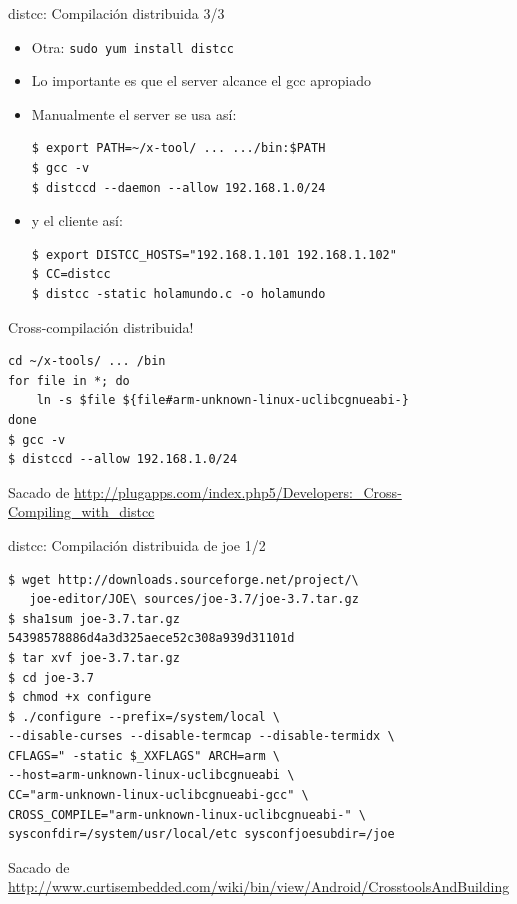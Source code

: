 \documentclass[xetex]{beamer}
\begin{document}
\begin{frame}[fragile]{distcc: Compilación distribuida 3/3}
\begin{itemize}
\item Otra: \verb=sudo yum install distcc =
\item Lo importante es que el server alcance el gcc apropiado
\item Manualmente el server se usa así: 
\begin{verbatim}
$ export PATH=~/x-tool/ ... .../bin:$PATH
$ gcc -v 
$ distccd --daemon --allow 192.168.1.0/24
\end{verbatim}
\item y el cliente así:
\begin{verbatim}
$ export DISTCC_HOSTS="192.168.1.101 192.168.1.102"
$ CC=distcc
$ distcc -static holamundo.c -o holamundo
\end{verbatim}
\end{itemize}
\end{frame}

\begin{frame}[fragile]{Cross-compilación distribuida!}
\begin{verbatim}
cd ~/x-tools/ ... /bin
for file in *; do
    ln -s $file ${file#arm-unknown-linux-uclibcgnueabi-}
done
$ gcc -v
$ distccd --allow 192.168.1.0/24
\end{verbatim}
Sacado de \url{http://plugapps.com/index.php5/Developers:_Cross-Compiling_with_distcc}
\end{frame}


\begin{frame}[fragile]{distcc: Compilación distribuida de joe 1/2}
\begin{verbatim}
$ wget http://downloads.sourceforge.net/project/\
   joe-editor/JOE\ sources/joe-3.7/joe-3.7.tar.gz  
$ sha1sum joe-3.7.tar.gz 
54398578886d4a3d325aece52c308a939d31101d 
$ tar xvf joe-3.7.tar.gz
$ cd joe-3.7
$ chmod +x configure
$ ./configure --prefix=/system/local \
--disable-curses --disable-termcap --disable-termidx \ 
CFLAGS=" -static $_XXFLAGS" ARCH=arm \
--host=arm-unknown-linux-uclibcgnueabi \
CC="arm-unknown-linux-uclibcgnueabi-gcc" \ 
CROSS_COMPILE="arm-unknown-linux-uclibcgnueabi-" \ 
sysconfdir=/system/usr/local/etc sysconfjoesubdir=/joe 
\end{verbatim}
{\small Sacado de \url{http://www.curtisembedded.com/wiki/bin/view/Android/CrosstoolsAndBuilding}}
\end{frame}
\end{document}
